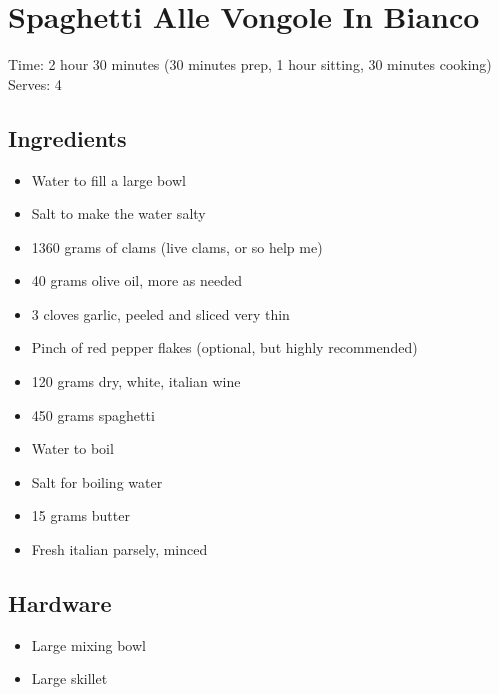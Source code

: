 \section{Spaghetti Alle Vongole In Bianco}
\label{spaghettiAlleVongoleInBianco}
\setcounter{secnumdepth}{0}
Time: 2 hour 30 minutes (30 minutes prep, 1 hour sitting, 30 minutes cooking)
Serves: 4

\begin{multicols}{2}
\subsection*{Ingredients}
\begin{itemize}
    \item Water to fill a large bowl
    \item Salt to make the water salty
    \item 1360 grams of clams (live clams, or so help me)
    \item 40 grams olive oil, more as needed
    \item 3 cloves garlic, peeled and sliced very thin
    \item Pinch of red pepper flakes (optional, but highly recommended)
    \item 120 grams dry, white, italian wine
    \item 450 grams spaghetti
    \item Water to boil
    \item Salt for boiling water
    \item 15 grams butter
    \item Fresh italian parsely, minced
\end{itemize}

\subsection*{Hardware}
\begin{itemize}
    \item Large mixing bowl
    \item Large skillet
\end{itemize}
\clearpage


\end{multicols}
